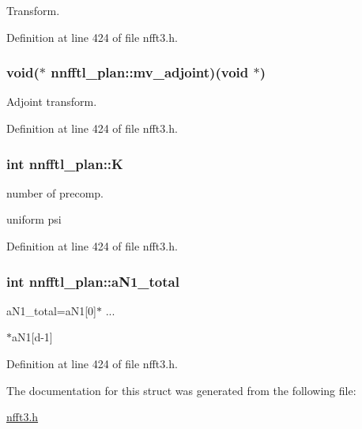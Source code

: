 Transform. 



Definition at line 424 of file nfft3.\-h.

\hypertarget{structnnfftl__plan_aa6098f51f9c69196ca782a1b0f8feeba}{
\subsubsection[{mv\-\_\-adjoint}]{\setlength{\rightskip}{0pt plus 5cm}void($\ast$ nnfftl\-\_\-plan\-::mv\-\_\-adjoint)(void $\ast$)}}\label{structnnfftl__plan_aa6098f51f9c69196ca782a1b0f8feeba}


Adjoint transform. 



Definition at line 424 of file nfft3.\-h.

\hypertarget{structnnfftl__plan_a574648230ce316a55282f362774aa615}{
\subsubsection[{K}]{\setlength{\rightskip}{0pt plus 5cm}int nnfftl\-\_\-plan\-::\-K}}\label{structnnfftl__plan_a574648230ce316a55282f362774aa615}


number of precomp. 

uniform psi 

Definition at line 424 of file nfft3.\-h.

\hypertarget{structnnfftl__plan_aa791fcca6424d42640020e178e8319e7}{
\subsubsection[{a\-N1\-\_\-total}]{\setlength{\rightskip}{0pt plus 5cm}int nnfftl\-\_\-plan\-::a\-N1\-\_\-total}}\label{structnnfftl__plan_aa791fcca6424d42640020e178e8319e7}


a\-N1\-\_\-total=a\-N1\mbox{[}0\mbox{]}$\ast$ ... 

$\ast$a\-N1\mbox{[}d-\/1\mbox{]} 

Definition at line 424 of file nfft3.\-h.



The documentation for this struct was generated from the following file\-:\begin{DoxyCompactItemize}
\item 
\hyperlink{nfft3_8h}{nfft3.\-h}\end{DoxyCompactItemize}
